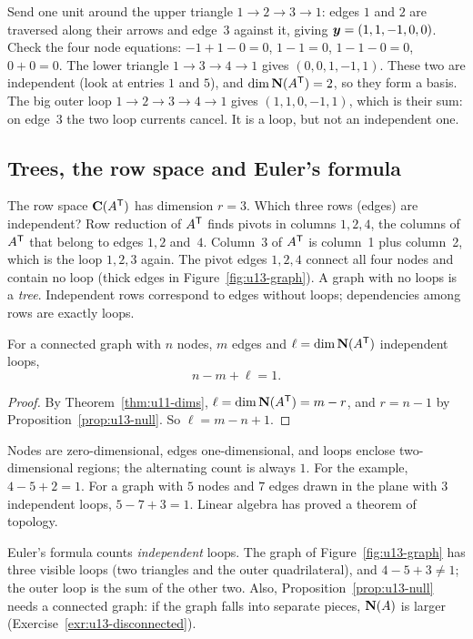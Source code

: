 \begin{example}\label{ex:u13-loops}
Send one unit around the upper triangle $1\to2\to3\to1$: edges $1$ and $2$ are traversed along
their arrows and edge~$3$ against it, giving $\boldsymbol{y}=(1,1,-1,0,0)$. Check the four node equations:
$-1+1-0=0$, $1-1=0$, $1-1-0=0$, $0+0=0$. The lower triangle $1\to3\to4\to1$ gives
$(0,0,1,-1,1)$. These two are independent (look at entries $1$ and $5$), and $\dim\mathbf{N}(A^{\mathsf{T}})=2$,
so they form a basis. The big outer loop $1\to2\to3\to4\to1$ gives $(1,1,0,-1,1)$, which is
their sum: on edge~3 the two loop currents cancel. It is a loop, but not an independent one.
\end{example}

\subsection{Trees, the row space and Euler's formula}

The row space $\mathbf{C}(A^{\mathsf{T}})$ has dimension $r=3$. Which three rows (edges) are independent? Row
reduction of $A^{\mathsf{T}}$ finds pivots in columns $1,2,4$, the columns of $A^{\mathsf{T}}$ that belong to edges $1,2$
and~$4$. Column~3 of $A^{\mathsf{T}}$ is column~1 plus column~2, which is the loop $1,2,3$ again. The pivot edges
$1,2,4$ connect all four nodes and contain no loop (thick edges in Figure~\ref{fig:u13-graph}).
A graph with no loops is a \emph{tree}. Independent rows correspond to edges without loops;
dependencies among rows are exactly loops.

\begin{theorem}\label{thm:u13-euler}
For a connected graph with $n$ nodes, $m$ edges and $\ell=\dim\mathbf{N}(A^{\mathsf{T}})$ independent loops,
\[
n-m+\ell=1.
\]
\end{theorem}
\begin{proof}
By Theorem~\ref{thm:u11-dims}, $\ell=\dim\mathbf{N}(A^{\mathsf{T}})=m-r$, and $r=n-1$ by
Proposition~\ref{prop:u13-null}. So $\ell=m-n+1$.
\end{proof}

Nodes are zero-dimensional, edges one-dimensional, and loops enclose two-dimensional regions; the
alternating count is always $1$. For the example, $4-5+2=1$. For a graph with $5$ nodes and $7$
edges drawn in the plane with $3$ independent loops, $5-7+3=1$. Linear algebra has proved a theorem
of topology.

\begin{trap}
Euler's formula counts \emph{independent} loops. The graph of Figure~\ref{fig:u13-graph} has three
visible loops (two triangles and the outer quadrilateral), and $4-5+3\neq1$; the outer loop is the
sum of the other two. Also, Proposition~\ref{prop:u13-null} needs a connected graph: if the graph
falls into separate pieces, $\mathbf{N}(A)$ is larger (Exercise~\ref{exr:u13-disconnected}).
\end{trap}

